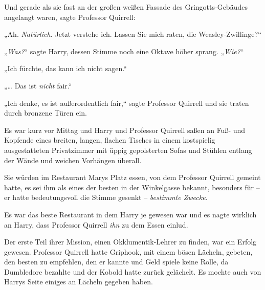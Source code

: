 Und gerade als sie fast an der großen weißen Fassade des Gringotts-Gebäudes angelangt waren, sagte Professor Quirrell:

„Ah. \emph{Natürlich.} Jetzt verstehe ich. Lassen Sie mich raten, die Weasley-Zwillinge?“

„\emph{Was?}“ sagte Harry, dessen Stimme noch eine Oktave höher sprang. „\emph{Wie?}“

„Ich fürchte, das kann ich nicht sagen.“

„… Das ist \emph{nicht} fair.“

„Ich denke, es ist außerordentlich fair,“ sagte Professor Quirrell und sie traten durch bronzene Türen ein.

\later

Es war kurz vor Mittag und Harry und Professor Quirrell saßen an Fuß- und Kopfende eines breiten, langen, flachen Tisches in einem kostspielig ausgestatteten Privatzimmer mit üppig gepolsterten Sofas und Stühlen entlang der Wände und weichen Vorhängen überall.

Sie würden im Restaurant Marys Platz essen, von dem Professor Quirrell gemeint hatte, es sei ihm als eines der besten in der Winkelgasse bekannt, besonders für -- er hatte bedeutungsvoll die Stimme gesenkt -- \emph{bestimmte Zwecke.}

Es war das beste Restaurant in dem Harry je gewesen war und es nagte wirklich an Harry, dass Professor Quirrell \emph{ihn} zu dem Essen einlud.

Der erste Teil ihrer Mission, einen Okklumentik-Lehrer zu finden, war ein Erfolg gewesen. Professor Quirrell hatte Griphook, mit einem bösen Lächeln, gebeten, den besten zu empfehlen, den er kannte und Geld spiele keine Rolle, da Dumbledore bezahlte und der Kobold hatte zurück gelächelt. Es mochte auch von Harrys Seite einiges an Lächeln gegeben haben.

